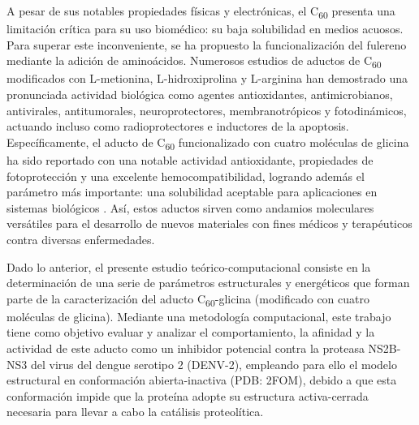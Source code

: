 A pesar de sus notables propiedades físicas y electrónicas, el C\textsubscript{60} presenta una limitación crítica para su uso biomédico: su baja solubilidad en medios acuosos. Para superar este inconveniente, se ha propuesto la funcionalización del fulereno mediante la adición de aminoácidos. Numerosos estudios de aductos de C\textsubscript{60} modificados con L-metionina, L-hidroxiprolina y L-arginina han demostrado una pronunciada actividad biológica como agentes antioxidantes, antimicrobianos, antivirales, antitumorales, neuroprotectores, membranotrópicos y fotodinámicos, actuando incluso como radioprotectores e inductores de la apoptosis. Específicamente, el aducto de C\textsubscript{60} funcionalizado con cuatro moléculas de glicina ha sido reportado con una notable actividad antioxidante, propiedades de fotoprotección y una excelente hemocompatibilidad, logrando además el parámetro más importante: una solubilidad aceptable para aplicaciones en sistemas biológicos \cite{krishna2024dengue}. Así, estos aductos sirven como andamios moleculares versátiles para el desarrollo de nuevos materiales con fines médicos y terapéuticos contra diversas enfermedades.

Dado lo anterior, el presente estudio teórico-computacional consiste en la determinación de una serie de parámetros estructurales y energéticos que forman parte de la caracterización del aducto C\textsubscript{60}-glicina (modificado con cuatro moléculas de glicina). Mediante una metodología computacional, este trabajo tiene como objetivo evaluar y analizar el comportamiento, la afinidad y la actividad de este aducto como un inhibidor potencial contra la proteasa NS2B-NS3 del virus del dengue serotipo 2 (DENV-2), empleando para ello el modelo estructural en conformación abierta-inactiva (PDB: 2FOM), debido a que esta conformación impide que la proteína adopte su estructura activa-cerrada necesaria para llevar a cabo la catálisis proteolítica. 



